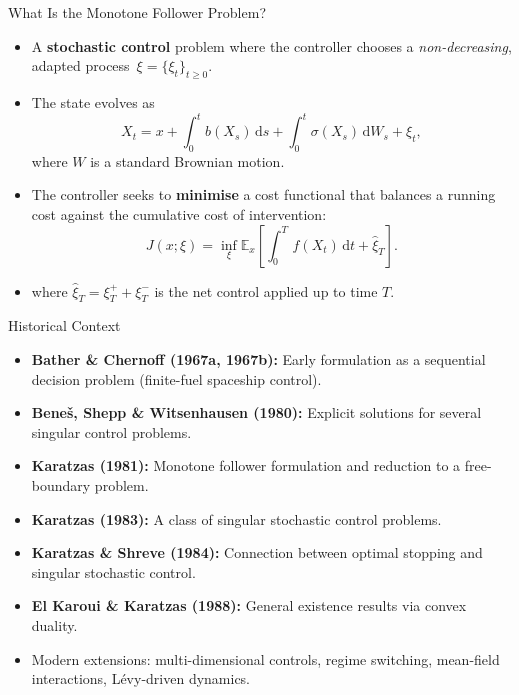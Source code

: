 \documentclass[11pt, aspectratio=169]{beamer}
\theoremstyle{plain}
\newcommand{\E}{\mathbb{E}}
\newcommand{\df}{\mathrm{d}}
\begin{document}
\begin{frame}{What Is the Monotone Follower Problem?}
  \begin{itemize}
    \item A \textbf{stochastic control} problem where the controller
          chooses a \emph{non-decreasing}, adapted process~$\xi = \{\xi_t\}_{t\ge 0}$.
    \item The state evolves as
    \[
      X_t = x + \int_0^t b(X_s)\,\df s
            + \int_0^t \sigma(X_s)\,\df W_s + \xi_t,
    \]
    where $W$ is a standard Brownian motion.
    \item The controller seeks to \textbf{minimise} a cost functional that
          balances a running cost against the cumulative cost of intervention:
          \begin{equation*}
            J(x;\xi) = \inf_{\xi}\E_x\!\left[
              \int_0^{T} \, f(X_t)\,\df t + \hat{\xi}_T
            \right].
          \end{equation*}
  \item where $\hat{\xi}_T=\xi^+_T+\xi^-_T$ is the net control applied up to time $T$.
  \end{itemize}
\end{frame}


\begin{frame}{Historical Context}
  \begin{itemize}
    \item \textbf{Bather \& Chernoff (1967a, 1967b):}
          Early formulation as a sequential decision problem (finite-fuel spaceship control).
    \item \textbf{Bene\v{s}, Shepp \& Witsenhausen (1980):}
          Explicit solutions for several singular control problems.
    \item \textbf{Karatzas (1981):}
          Monotone follower formulation and reduction to a free-boundary problem.
    \item \textbf{Karatzas (1983):}
          A class of singular stochastic control problems.
    \item \textbf{Karatzas \& Shreve (1984):}
          Connection between optimal stopping and singular stochastic control.
    \item \textbf{El Karoui \& Karatzas (1988):}
          General existence results via convex duality.
    \item Modern extensions: multi-dimensional controls, regime switching,
          mean-field interactions, L\'evy-driven dynamics.
  \end{itemize}
\end{frame}
\end{document}
